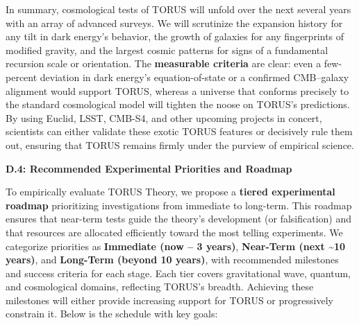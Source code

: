 In summary, cosmological tests of TORUS will unfold over the next
several years with an array of advanced surveys. We will scrutinize the
expansion history for any tilt in dark energy's behavior, the growth of
galaxies for any fingerprints of modified gravity, and the largest
cosmic patterns for signs of a fundamental recursion scale or
orientation. The \textbf{measurable criteria} are clear: even a
few-percent deviation in dark energy's equation-of-state or a confirmed
CMB--galaxy alignment would support TORUS, whereas a universe that
conforms precisely to the standard cosmological model will tighten the
noose on TORUS's predictions. By using Euclid, LSST, CMB-S4, and other
upcoming projects in concert, scientists can either validate these
exotic TORUS features or decisively rule them out, ensuring that TORUS
remains firmly under the purview of empirical science.

\textbf{D.4: Recommended Experimental Priorities and Roadmap}

To empirically evaluate TORUS Theory, we propose a \textbf{tiered
experimental roadmap} prioritizing investigations from immediate to
long-term. This roadmap ensures that near-term tests guide the theory's
development (or falsification) and that resources are allocated
efficiently toward the most telling experiments. We categorize
priorities as \textbf{Immediate (now -- 3 years)}, \textbf{Near-Term
(next \textasciitilde{}10 years)}, and \textbf{Long-Term (beyond 10
years)}, with recommended milestones and success criteria for each
stage. Each tier covers gravitational wave, quantum, and cosmological
domains, reflecting TORUS's breadth. Achieving these milestones will
either provide increasing support for TORUS or progressively constrain
it. Below is the schedule with key goals:

